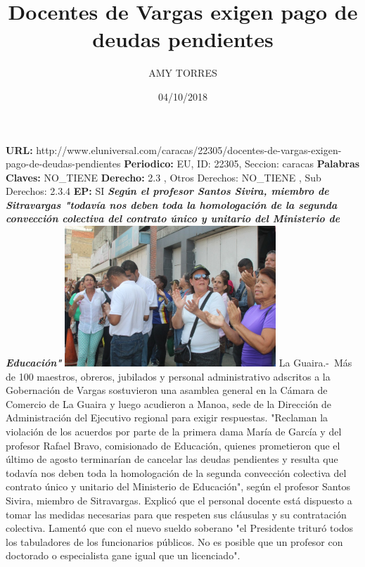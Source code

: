 \documentclass{article}%
\title{\textbf{Docentes de Vargas exigen pago de deudas pendientes}}%
\author{AMY TORRES}%
\date{04/10/2018}%
\begin{document}
%
\normalsize%
\maketitle%
\textbf{URL: }%
http://www.eluniversal.com/caracas/22305/docentes{-}de{-}vargas{-}exigen{-}pago{-}de{-}deudas{-}pendientes\newline%
%
\textbf{Periodico: }%
EU, %
ID: %
22305, %
Seccion: %
caracas\newline%
%
\textbf{Palabras Claves: }%
NO\_TIENE\newline%
%
\textbf{Derecho: }%
2.3%
, Otros Derechos: %
NO\_TIENE%
, Sub Derechos: %
2.3.4%
\newline%
%
\textbf{EP: }%
SI\newline%
\newline%
%
\textbf{\textit{Según el profesor Santos Sivira, miembro de Sitravargas "todavía nos deben toda la homologación de la segunda convección colectiva del contrato único y unitario del Ministerio de Educación"}}%
\newline%
\newline%
%
\includegraphics[width=300px]{200.jpg}%
\newline%
%
La Guaira.{-}~Más de 100 maestros, obreros, jubilados y personal administrativo adscritos a la Gobernación de Vargas sostuvieron una asamblea general en la Cámara de Comercio de La Guaira y luego acudieron a Manoa, sede de la Dirección de Administración del Ejecutivo regional para exigir respuestas.%
\newline%
%
"Reclaman la violación de los acuerdos por parte de la primera dama María de García y del profesor Rafael Bravo, comisionado de Educación, quienes prometieron que el último de agosto terminarían de cancelar las deudas pendientes y resulta que todavía nos deben toda la homologación de la segunda convección colectiva del contrato único y unitario del Ministerio de Educación", según el profesor Santos Sivira, miembro de Sitravargas.%
\newline%
%
Explicó que el personal docente está dispuesto a tomar las medidas necesarias para que respeten sus cláusulas y su contratación colectiva. Lamentó que con el nuevo sueldo soberano "el Presidente trituró todos los tabuladores de los funcionarios públicos. No es posible que un profesor con doctorado o especialista gane igual que un licenciado".%
\end{document}
